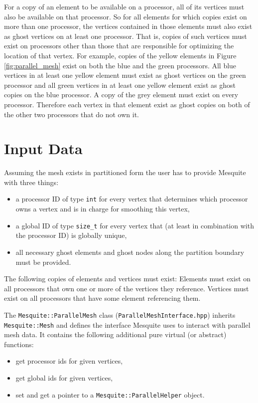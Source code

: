 For a copy of an element to be available on a processor, all of its vertices must also be available on that processor.  So for all elements for which copies exist on more than one processor, the vertices contained in those elements must also exist as ghost vertices on at least one processor.  That is, copies of such vertices must exist on processors other than those that are responsible for optimizing the location of that vertex.  For example, copies of the yellow elements in Figure \ref{fig:parallel_mesh} exist on both the blue and the green processors.  All blue vertices in at least one yellow element must exist as ghost vertices on the green processor and all green vertices in at least one yellow element exist as ghost copies on the blue processor.  A copy of the grey element must exist on every processor.  Therefore each vertex in that element exist as ghost copies on both of the other two processors that do not own it.  


\section{Input Data}

Assuming the mesh exists in partitioned form the user has to provide Mesquite with three things:
\begin{itemize}
\item a processor ID of type \texttt{int} for every vertex that determines which processor owns a vertex and is in charge for smoothing this vertex,
\item a global ID of type \texttt{size\_t} for every vertex that (at least in combination with the processor ID) is globally unique,
\item all necessary ghost elements and ghost nodes along the partition boundary must be provided.
\end{itemize}

The following copies of elements and vertices must exist: Elements must exist on all processors that own one or more of the vertices they reference. Vertices must exist on all processors that have some element referencing them.

The \texttt{Mesquite::ParallelMesh} class (\texttt{ParallelMeshInterface.hpp}) inherits \texttt{Mesquite::Mesh} and defines the interface Mesquite uses to interact with parallel mesh data. It contains the following additional pure virtual (or abstract) functions:
\begin{itemize}
\item get processor ids for given vertices,
\item get global ids for given vertices,
\item set and get a pointer to a \texttt{Mesquite::ParallelHelper} object.
\end{itemize}

